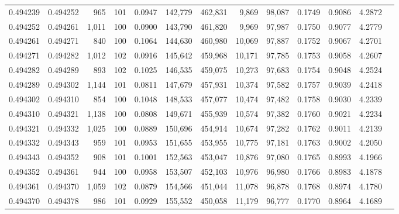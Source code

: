 \begin{tabular}{rrrrrrrrrrrrr}
0.494239 & 0.494252 &   965 & 101 &                                     0.0947 & 142,779 & 462,831 &   9,869 &  98,087 & 0.1749 & 0.9086 & 4.2872 \\
0.494252 & 0.494261 & 1,011 & 100 &                                     0.0900 & 143,790 & 461,820 &   9,969 &  97,987 & 0.1750 & 0.9077 & 4.2779 \\
0.494261 & 0.494271 &   840 & 100 &                                     0.1064 & 144,630 & 460,980 &  10,069 &  97,887 & 0.1752 & 0.9067 & 4.2701 \\
0.494271 & 0.494282 & 1,012 & 102 &                                     0.0916 & 145,642 & 459,968 &  10,171 &  97,785 & 0.1753 & 0.9058 & 4.2607 \\
0.494282 & 0.494289 &   893 & 102 &                                     0.1025 & 146,535 & 459,075 &  10,273 &  97,683 & 0.1754 & 0.9048 & 4.2524 \\
0.494289 & 0.494302 & 1,144 & 101 &                                     0.0811 & 147,679 & 457,931 &  10,374 &  97,582 & 0.1757 & 0.9039 & 4.2418 \\
0.494302 & 0.494310 &   854 & 100 &                                     0.1048 & 148,533 & 457,077 &  10,474 &  97,482 & 0.1758 & 0.9030 & 4.2339 \\
0.494310 & 0.494321 & 1,138 & 100 &                                     0.0808 & 149,671 & 455,939 &  10,574 &  97,382 & 0.1760 & 0.9021 & 4.2234 \\
0.494321 & 0.494332 & 1,025 & 100 &                                     0.0889 & 150,696 & 454,914 &  10,674 &  97,282 & 0.1762 & 0.9011 & 4.2139 \\
0.494332 & 0.494343 &   959 & 101 &                                     0.0953 & 151,655 & 453,955 &  10,775 &  97,181 & 0.1763 & 0.9002 & 4.2050 \\
0.494343 & 0.494352 &   908 & 101 &                                     0.1001 & 152,563 & 453,047 &  10,876 &  97,080 & 0.1765 & 0.8993 & 4.1966 \\
0.494352 & 0.494361 &   944 & 100 &                                     0.0958 & 153,507 & 452,103 &  10,976 &  96,980 & 0.1766 & 0.8983 & 4.1878 \\
0.494361 & 0.494370 & 1,059 & 102 &                                     0.0879 & 154,566 & 451,044 &  11,078 &  96,878 & 0.1768 & 0.8974 & 4.1780 \\
0.494370 & 0.494378 &   986 & 101 &                                     0.0929 & 155,552 & 450,058 &  11,179 &  96,777 & 0.1770 & 0.8964 & 4.1689 \\

\end{tabular}
